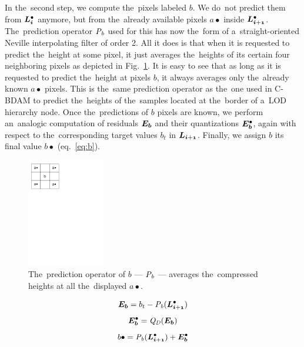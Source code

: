 In the~second step, we compute the~pixels labeled $b$. We do~not predict them from $\ldot{i}$ anymore, but from the~already available pixels $a\bullet$ inside $\ldot{i+1}$. The~prediction operator $\mathit{P_{b}}$ used for this has now the~form of a~straight-oriented Neville interpolating filter of order 2. All it does is that when it is requested to predict the~height at some pixel, it just averages the~heights of its certain four neighboring pixels as depicted in Fig.~\ref{fig:bcomp}. It is easy to see that as long as it is requested to predict the~height at pixels $b$, it always averages only the~already known $a\bullet$ pixels. This is the~same prediction operator as the~one used in C-BDAM to predict the~heights of the~samples located at the~border of a~LOD hierarchy node. Once the~predictions of $b$ pixels are known, we perform an~analogic computation of residuals $\objnorm{E}{b}$ and their quantizations $\objdot{E}{b}$, again with respect to the~corresponding target values $b_t$ in $\lnorm{i+1}$. Finally, we assign $b$ its final value $b\bullet$ (eq.~\ref{eq:b}).

\begin{figure}
	\includegraphics[trim={0 21cm 10cm 0}, clip, width=0.3\textwidth]{figures/bcomp.pdf}\centering
	\caption{The~prediction operator of $b$ --- $\mathit{P_{b}}$ --- averages the~compressed heights at all the~displayed $a\bullet$.}
	\label{fig:bcomp}
\end{figure}

$$\objnorm{E}{b} = b_t - \opnorm{P}{b}(\ldot{i+1})$$
$$\objdot{E}{b} = \opnorm{Q}{D}(\objnorm{E}{b})$$
\begin{equation}
\label{eq:b}
b\bullet = \opnorm{P}{b}(\ldot{i+1}) + \objdot{E}{b}
\end{equation}


